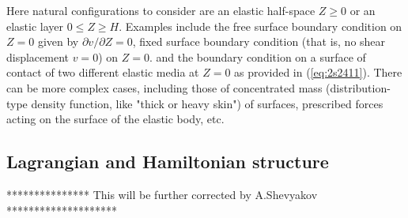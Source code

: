 \documentclass[11pt,letter,subeqn,fleqn]{article}
\numberwithin{equation}{section}
\numberwithin{table}{section}
\numberwithin{figure}{section}
\begin{document}
Here natural configurations to consider are an elastic half-space $Z \geq 0$ or an elastic layer $0\leq Z \geq H$. Examples include the free surface boundary condition on $Z=0$ given by $\partial v/\partial Z=0$, fixed surface boundary condition (that is, no shear displacement $v=0$) on $Z=0$. and the boundary condition on a surface of contact of two different elastic media at $Z=0$ as provided in (\ref{eq:2s2411}). There can be more complex cases, including those of concentrated mass (distribution-type density function, like "thick or heavy skin") of surfaces, prescribed forces acting on the surface of the elastic body, etc.

\subsection{Lagrangian and Hamiltonian structure}\label{sec:LagrHamilstructure}
*************** This will be further corrected by A.Shevyakov ********************
\end{document}
